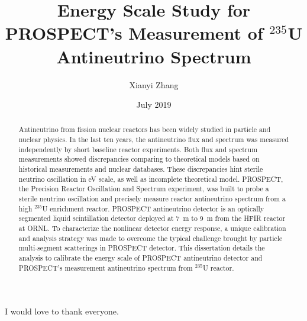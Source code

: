 \documentclass[nofootinbib]{iit}%
\author{Xianyi Zhang}
\title{Energy Scale Study for PROSPECT's Measurement of $^{235}$U Antineutrino Spectrum}
\date{July 2019}
\begin{document}
\maketitle

\prelimpages
\begin{acknowledgement}
\setcounter{page}{3}
    I would love to thank everyone.
\end{acknowledgement}

\newpage
\tableofcontents

\newpage
\listoftables

\newpage
\listoffigures

\newpage
\begin{abstract}
    Antineutrino from fission nuclear reactors has been widely studied in particle and nuclear physics.
    In the last ten years, the antineutrino flux and spectrum was measured independently by short baseline reactor experiments. 
    Both flux and spectrum measurements showed discrepancies comparing to theoretical models based on historical measurements and nuclear databases.
    These discrepancies hint sterile neutrino oscillation in eV scale, as well as incomplete theoretical model. 
    PROSPECT, the Precision Reactor Oscillation and Spectrum experiment, was built to probe a sterile neutrino oscillation and precisely measure reactor antineutrino spectrum from a high $^{235}$U enrichment reactor.
    PROSPECT antineutrino detector is an optically segmented liquid scintillation detector deployed at 7~m to 9~m from the HFIR reactor at ORNL.
    To characterize the nonlinear detector energy response, a unique calibration and analysis strategy was made to overcome the typical challenge brought by particle multi-segment scatterings in PROSPECT detector.
    This dissertation details the analysis to calibrate the energy scale of PROSPECT antineutrino detector and PROSPECT's measurement antineutrino spectrum from $^{235}$U reactor.
    
\end{abstract}

\textpages
{}



















\end{document}
